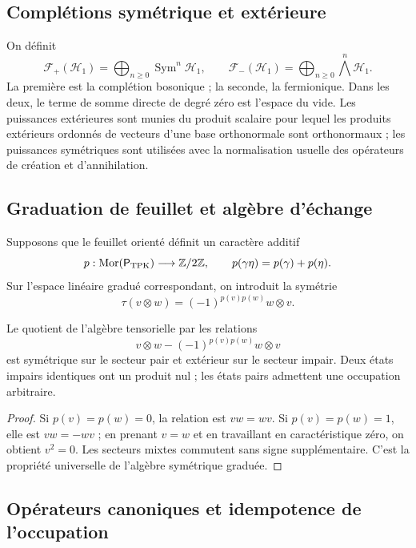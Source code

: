 \subsection{Complétions symétrique et extérieure}
\label{v:v:rec:completaciones:section:03}

On définit
\[
 \mathcal F_+(\mathcal H_1)=
 \bigoplus_{n\geq0}\operatorname{Sym}^n\mathcal H_1,
 \qquad
 \mathcal F_-(\mathcal H_1)=
 \bigoplus_{n\geq0}\bigwedge^n\mathcal H_1.
\]
La première est la complétion bosonique ; la seconde, la fermionique. Dans les deux,
le terme de somme directe de degré zéro est l’espace du vide. Les puissances extérieures
sont munies du produit scalaire pour lequel les produits extérieurs ordonnés de vecteurs
d’une base orthonormale sont orthonormaux ; les puissances symétriques sont utilisées
avec la normalisation usuelle des opérateurs de création et d’annihilation.

\subsection{Graduation de feuillet et algèbre d’échange}
\label{v:v:rec:completaciones:section:04}

Supposons que le feuillet orienté définit un caractère additif
\[
 p:\operatorname{Mor}(\mathsf P_{\rm TPK})\longrightarrow\mathbb Z/2\mathbb Z,
 \qquad p(\gamma\eta)=p(\gamma)+p(\eta).
\]
Sur l’espace linéaire gradué correspondant, on introduit la symétrie
\[
 \tau(v\otimes w)=(-1)^{p(v)p(w)}w\otimes v.
\]

\begin{theorem}
\label{v:v:rec:completaciones:statement:02}
Le quotient de l’algèbre tensorielle par les relations
\[
 v\otimes w-(-1)^{p(v)p(w)}w\otimes v
\]
est symétrique sur le secteur pair et extérieur sur le secteur impair. Deux états
impairs identiques ont un produit nul ; les états pairs admettent une occupation
arbitraire.
\end{theorem}

\begin{proof}
Si \(p(v)=p(w)=0\), la relation est \(vw=wv\). Si
\(p(v)=p(w)=1\), elle est \(vw=-wv\) ; en prenant \(v=w\) et en travaillant en
caractéristique zéro, on obtient \(v^2=0\). Les secteurs mixtes commutent sans
signe supplémentaire. C’est la propriété universelle de l’algèbre symétrique
graduée.
\end{proof}

\subsection{Opérateurs canoniques et idempotence de l’occupation}
\label{v:v:pauli:car-construccion}

